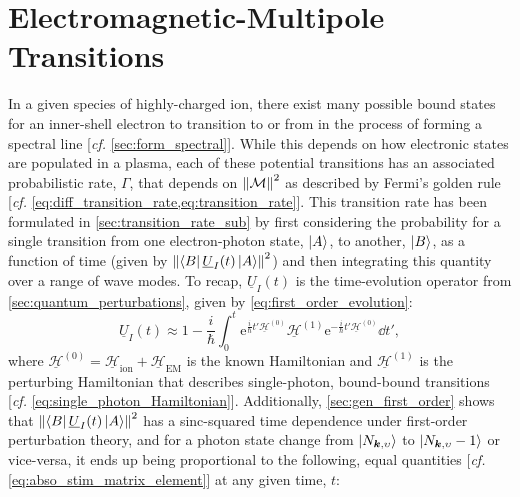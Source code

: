 \section{Electromagnetic-Multipole Transitions}\label{sec:multipole}
In a given species of highly-charged ion, there exist many possible bound states for an inner-shell electron to transition to or from in the process of forming a spectral line [\emph{cf.\@} \cref{sec:form_spectral}]. 
While this depends on how electronic states are populated in a plasma, each of these potential transitions has an associated probabilistic rate, $\Gamma$, that depends on $\norm{\mathcal{M}}^2$ as described by Fermi's golden rule [\emph{cf.\@} \cref{eq:diff_transition_rate,eq:transition_rate}]. 
This transition rate has been formulated in \cref{sec:transition_rate_sub} by first considering the probability for a single transition from one electron-photon state, $\ket{A}$, to another, $\ket{B}$, as a function of time (given by $\norm{\bra{B} \underline{U}_I (t) \ket{A}}^2$) and then integrating this quantity over a range of wave modes. 
To recap, $\underline{U}_I (t)$ is the time-evolution operator from \cref{sec:quantum_perturbations}, given by \cref{eq:first_order_evolution}:
\begin{equation}\label{eq:first_order_evolution_recap}
 \underline{U}_I (t) \approx 1 - \frac{i}{\hbar} \int_0^t \mathrm{e}^{\frac{i}{\hbar} t' \underline{\mathcal{H}}^{(0)}} \underline{\mathcal{H}}^{(1)} \mathrm{e}^{-\frac{i}{\hbar} t' \underline{\mathcal{H}}^{(0)}} \dd{t'} ,
 \end{equation}
where $\underline{\mathcal{H}}^{(0)} = \underline{\mathcal{H}}_{\text{ion}} + \underline{\mathcal{H}}_{\text{EM}}$ is the known Hamiltonian and $\underline{\mathcal{H}}^{(1)}$ is the perturbing Hamiltonian that describes single-photon, bound-bound transitions [\emph{cf.\@} \cref{eq:single_photon_Hamiltonian}]. 
Additionally, \cref{sec:gen_first_order} shows that $\norm{\bra{B} \underline{U}_I (t) \ket{A}}^2$ has a sinc-squared time dependence under first-order perturbation theory, and for a photon state change from $\ket{N_{\mathbold{k},\upsilon}}$ to $\ket{N_{\mathbold{k},\upsilon} - 1}$ or vice-versa, it ends up being proportional to the following, equal quantities [\emph{cf.\@} \cref{eq:abso_stim_matrix_element}] at any given time, $t$:
